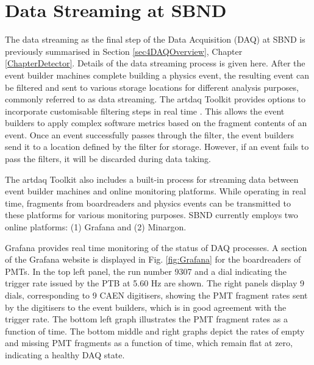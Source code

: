 \chapter{Data Streaming at SBND} 
\label{appendix_data_stream}
\ifpdf
    \graphicspath{{Appendix2/Figs/Raster/}{Appendix2/Figs/PDF/}{Appendix2/Figs/}}
\else
    \graphicspath{{Appendix2/Figs/Vector/}{Appendix2/Figs/}}
\fi

The data streaming as the final step of the Data Acquisition (DAQ) at SBND is previously summarised in Section \ref{sec4DAQOverview}, Chapter \ref{ChapterDetector}.
Details of the data streaming process is given here.
After the event builder machines complete building a physics event, the resulting event can be filtered and sent to various storage locations for different analysis purposes, commonly referred to as data streaming.
The artdaq Toolkit provides options to incorporate customisable filtering steps in real time \cite{artdaq_note}. 
This allows the event builders to apply complex software metrics based on the fragment contents of an event. 
Once an event successfully passes through the filter, the event builders send it to a location defined by the filter for storage. 
However, if an event fails to pass the filters, it will be discarded during data taking.

The artdaq Toolkit also includes a built-in process for streaming data between event builder machines and online monitoring platforms.
While operating in real time, fragments from boardreaders and physics events can be transmitted to these platforms for various monitoring purposes. 
SBND currently employs two online platforms: (1) Grafana and (2) Minargon.

Grafana provides real time monitoring of the status of DAQ processes. 
A section of the Grafana website is displayed in Fig. \ref{fig:Grafana} for the boardreaders of PMTs.
In the top left panel, the run number 9307 and a dial indicating the trigger rate issued by the PTB at 5.60 Hz are shown. 
The right panels display 9 dials, corresponding to 9 CAEN digitisers, showing the PMT fragment rates sent by the digitisers to the event builders, which is in good agreement with the trigger rate.
The bottom left graph illustrates the PMT fragment rates as a function of time. 
The bottom middle and right graphs depict the rates of empty and missing PMT fragments as a function of time, which remain flat at zero, indicating a healthy DAQ state.

